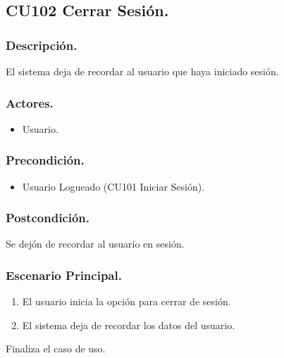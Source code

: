 \subsection{CU102 Cerrar Sesi\'{o}n.}
\subsubsection{Descripci\'{o}n.}
El sistema deja de recordar al usuario que haya iniciado sesi\'{o}n.
\subsubsection{Actores.}
\begin{itemize}
\item Usuario.
\end{itemize}
\subsubsection{Precondici\'{o}n.}
\begin{itemize}
\item Usuario Logueado (CU101 Iniciar Sesi\'{o}n).
\end{itemize}
\subsubsection{Postcondici\'{o}n.}
Se dej\'{o}n de recordar al usuario en sesi\'{o}n.
\subsubsection{Escenario Principal.}
\begin{enumerate}
\item El usuario inicia la opci\'{o}n para cerrar de sesi\'{o}n.
\item El sistema deja de recordar los datos del usuario.
\end{enumerate}
Finaliza el caso de uso.